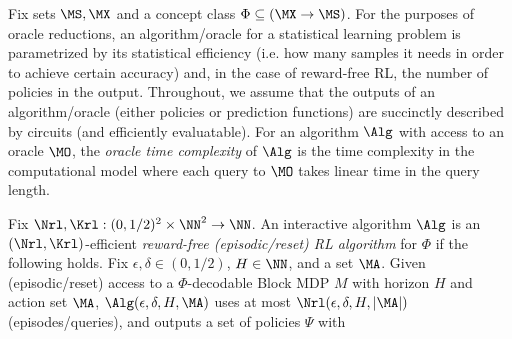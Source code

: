 Fix sets $\MS,\MX$ and a concept class $\Phi \subseteq (\MX\to\MS)$. For the purposes of oracle reductions, an algorithm/oracle for a statistical learning problem is parametrized by its statistical efficiency (i.e. how many samples it needs in order to achieve certain accuracy) and, in the case of reward-free RL, the number of policies in the output. Throughout, we assume that the outputs of an algorithm/oracle (either policies or prediction functions) are succinctly described by circuits (and efficiently evaluatable).
For an algorithm $\Alg$ with access to an oracle $\MO$, the \emph{oracle time complexity} of $\Alg$ is the time complexity in the computational model where each query to $\MO$ takes linear time in the query length.


\begin{definition}\label{def:strong-rf-rl}
Fix $\Nrl, \Krl: (0,1/2)^2 \times \NN^2 \to \NN$. An interactive algorithm $\Alg$ is an $(\Nrl,\Krl)$-efficient \emph{reward-free (episodic/reset) RL algorithm} for $\Phi$ if the following holds. Fix $\epsilon,\delta \in (0,1/2)$,  $H \in \NN$, and a set $\MA$. Given (episodic/reset) access to a $\Phi$-decodable Block MDP $M$ with horizon $H$ and action set $\MA$, $\Alg(\epsilon,\delta, H,\MA)$ uses at most $\Nrl(\epsilon,\delta,H,|\MA|)$ (episodes/queries), and outputs a set of policies $\Psi$ with
\end{definition}

